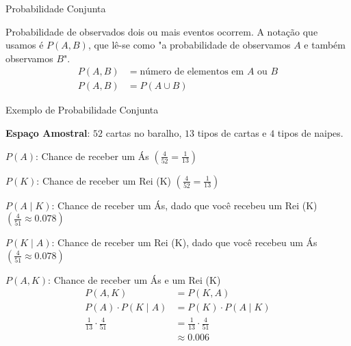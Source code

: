 \begin{frame}{Probabilidade Conjunta}
    \begin{defn}
        Probabilidade de observados dois ou mais eventos ocorrem. \newline \newline
        A notação que usamos é $P(A, B)$, que lê-se como
        "a probabilidade de observamos $A$ e também observamos $B$". \newline \newline
        $$
            \begin{aligned}
                P(A,B) &= \text{número de elementos em $A$ ou $B$} \\
                P(A,B) &= P(A \cup B)
            \end{aligned}
        $$
    \end{defn}
\end{frame}

\begin{frame}{Exemplo de Probabilidade Conjunta}
    \begin{exemplo}
        \begin{vfilleditems}
            {\footnotesize
            \item \textbf{Espaço Amostral}: $52$ cartas no baralho, $13$ tipos de cartas e $4$ tipos de naipes.
            \item $P(A)$: Chance de receber um Ás $\left( \frac{4}{52} = \frac{1}{13}\right)$
            \item $P(K)$: Chance de receber um Rei (K) $\left( \frac{4}{52} = \frac{1}{13} \right)$
            \item $P(A \mid K)$: Chance de receber um Ás, dado que você recebeu um Rei (K) $\left( \frac{4}{51} \approx 0.078 \right)$
            \item $P(K \mid A)$: Chance de receber um Rei (K), dado que você recebeu um Ás $\left( \frac{4}{51} \approx 0.078 \right)$
            }
            \item $P(A, K)$: Chance de receber um Ás e um Rei (K)
            $$
                \begin{aligned}
                    P(A, K) &= P(K, A) \\
                    P(A) \cdot P(K \mid A) &= P(K) \cdot P(A \mid K) \\
                    \frac{1}{13} \cdot \frac{4}{51} &= \frac{1}{13} \cdot \frac{4}{51} \\
                    &\approx 0.006
                \end{aligned}
            $$
        \end{vfilleditems}
    \end{exemplo}
\end{frame}

